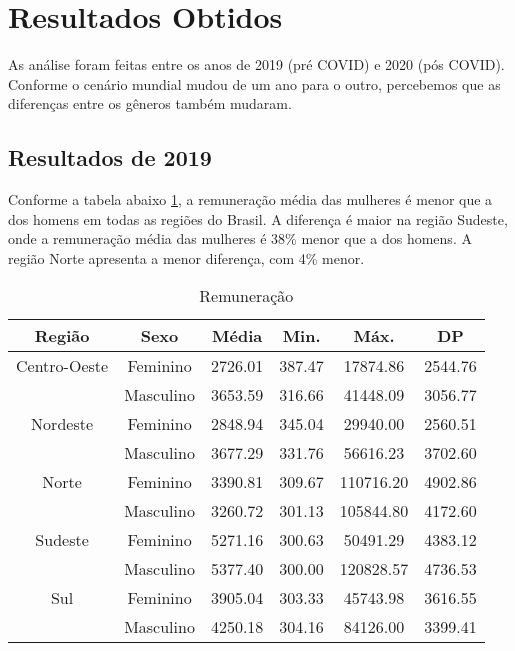 \section{Resultados Obtidos}

As análise foram feitas entre os anos de 2019 (pré COVID) e 2020 (pós COVID). Conforme o cenário mundial mudou de um ano para o outro, percebemos que as diferenças entre os gêneros também mudaram.

\subsection{Resultados de 2019}

Conforme a tabela abaixo \ref{remun}, a remuneração média das mulheres é menor que a dos homens em todas as regiões do Brasil. A diferença é maior na região Sudeste, onde a remuneração média das mulheres é 38\% menor que a dos homens. A região Norte apresenta a menor diferença, com 4\% menor.

\begin{table}[htbp]
	\caption{Remuneração}
	\begin{center}
		\begin{tabular}{|c|c|c|c|c|c|}
			\hline
			\textbf{Região} & \textbf{Sexo} & \textbf{Média} & \textbf{Min.} & \textbf{Máx.} & \textbf{DP} \\ 
			\hline
																																																																
			Centro-Oeste     & Feminino      & 2726.01         & 387.47        & 17874.86       & 2544.76     \\
			                 & Masculino     & 3653.59         & 316.66        & 41448.09       & 3056.77     \\
			\hline
			Nordeste         & Feminino      & 2848.94         & 345.04        & 29940.00       & 2560.51     \\
			                 & Masculino     & 3677.29         & 331.76        & 56616.23       & 3702.60     \\
			\hline
			Norte            & Feminino      & 3390.81         & 309.67        & 110716.20      & 4902.86     \\
			                 & Masculino     & 3260.72         & 301.13        & 105844.80      & 4172.60     \\
			\hline
			Sudeste          & Feminino      & 5271.16         & 300.63        & 50491.29       & 4383.12     \\
			                 & Masculino     & 5377.40         & 300.00        & 120828.57      & 4736.53     \\
			\hline
			Sul              & Feminino      & 3905.04         & 303.33        & 45743.98       & 3616.55     \\
			                 & Masculino     & 4250.18         & 304.16        & 84126.00       & 3399.41     \\
			\hline
		\end{tabular}
		\label{remun}
	\end{center}
\end{table}

